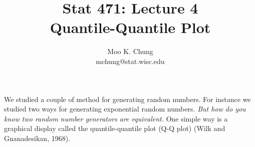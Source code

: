 \documentclass[11pt,twocolumn]{article} %
\begin{document}
\title{Stat 471: Lecture 4\\
Quantile-Quantile Plot}
\author{Moo K. Chung\\
mchung@stat.wisc.edu}
\maketitle \thispagestyle{empty}


We studied a couple of method for generating random numbers. For
instance we studied two ways for generating exponential random
numbers. {\em But how do you know two random number generators are
equivalent.} One simple way is a graphical display called the
quantile-quantile plot (Q-Q plot) (Wilk and Gnanadesikan, 1968).
\end{document}
